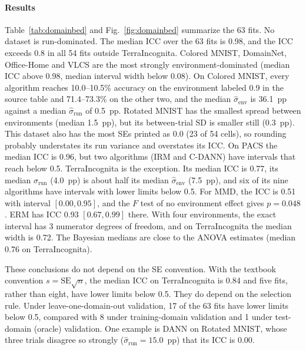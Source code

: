 \paragraph{Results} Table~\ref{tab:domainbed} and Fig.~\ref{fig:domainbed}
summarize the 63 fits. No dataset is run-dominated. The median ICC over the
63 fits is 0.98, and the ICC exceeds 0.8 in all 54 fits outside
TerraIncognita. Colored MNIST, DomainNet, Office-Home and VLCS are the most
strongly environment-dominated (median ICC above 0.98, median interval width
below 0.08). On Colored MNIST, every algorithm reaches 10.0--10.5\%
accuracy on the environment labeled 0.9 in the source table and
71.4--73.3\% on the other two, and the median $\hat\sigma_{\text{env}}$ is
36.1~pp against a median $\hat\sigma_{\text{run}}$ of 0.5~pp. Rotated MNIST
has the smallest spread between environments (median 1.5~pp), but its
between-trial SD is smaller still (0.3~pp). This dataset also has the most SEs
printed as 0.0 (23 of 54 cells), so rounding probably understates its run
variance and overstates its ICC. On PACS the median ICC is 0.96, but two
algorithms (IRM and C-DANN) have intervals that reach below 0.5.
TerraIncognita is the exception. Its median ICC is 0.77, its median
$\hat\sigma_{\text{run}}$ (4.0~pp) is about half its median
$\hat\sigma_{\text{env}}$ (7.5~pp), and six of its nine algorithms have
intervals with lower limits below 0.5. For MMD, the ICC is 0.51 with interval
$[0.00,0.95]$, and the $F$ test of no environment effect gives $p=0.048$.
ERM has ICC 0.93 $[0.67,0.99]$ there. With four environments, the exact interval has
3 numerator degrees of freedom, and on TerraIncognita the median width is
0.72. The Bayesian medians are close to the ANOVA estimates (median 0.76 on
TerraIncognita).

These conclusions do not depend on the SE convention. With the textbook
convention $s=\mathrm{SE}\sqrt n$, the median ICC on TerraIncognita is 0.84
and five fits, rather than eight, have lower limits below 0.5. They do depend
on the selection rule. Under leave-one-domain-out validation, 17 of the 63
fits have lower limits below 0.5, compared with 8 under training-domain
validation and 1 under test-domain (oracle) validation. One example is DANN on
Rotated MNIST, whose three trials disagree so strongly
($\hat\sigma_{\text{run}}=15.0$~pp) that its ICC is 0.00.


